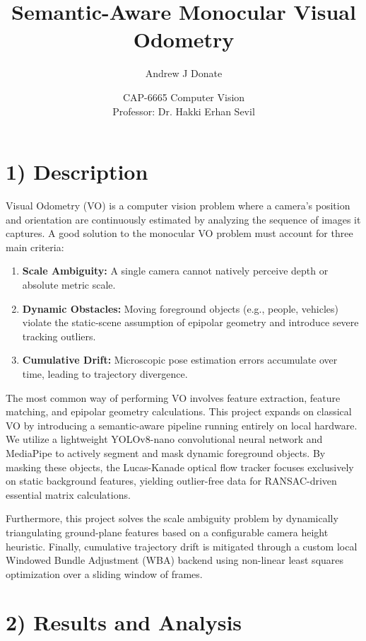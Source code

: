 \documentclass[12pt]{article}
\title{Semantic-Aware Monocular Visual Odometry}
\author{Andrew J Donate}
\date{CAP-6665 Computer Vision \\ Professor: Dr. Hakki Erhan Sevil}
\begin{document}
\maketitle

\section*{1) Description}

Visual Odometry (VO) is a computer vision problem where a camera's position and orientation are continuously estimated by analyzing the sequence of images it captures. A good solution to the monocular VO problem must account for three main criteria:
\begin{enumerate}
    \item \textbf{Scale Ambiguity:} A single camera cannot natively perceive depth or absolute metric scale.
    \item \textbf{Dynamic Obstacles:} Moving foreground objects (e.g., people, vehicles) violate the static-scene assumption of epipolar geometry and introduce severe tracking outliers.
    \item \textbf{Cumulative Drift:} Microscopic pose estimation errors accumulate over time, leading to trajectory divergence.
\end{enumerate}

The most common way of performing VO involves feature extraction, feature matching, and epipolar geometry calculations. This project expands on classical VO by introducing a semantic-aware pipeline running entirely on local hardware. We utilize a lightweight YOLOv8-nano convolutional neural network and MediaPipe to actively segment and mask dynamic foreground objects. By masking these objects, the Lucas-Kanade optical flow tracker focuses exclusively on static background features, yielding outlier-free data for RANSAC-driven essential matrix calculations. 

Furthermore, this project solves the scale ambiguity problem by dynamically triangulating ground-plane features based on a configurable camera height heuristic. Finally, cumulative trajectory drift is mitigated through a custom local Windowed Bundle Adjustment (WBA) backend using non-linear least squares optimization over a sliding window of frames.

\section*{2) Results and Analysis}
\end{document}
